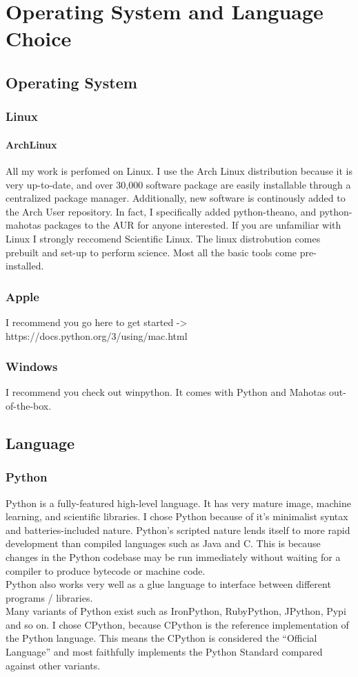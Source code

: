 \chapter{Operating System and Language Choice}

\section{Operating System}
\subsection{Linux}
\subsubsection{ArchLinux}
All my work is perfomed on Linux.  I use the Arch Linux distribution because it is very up-to-date, and over 30,000 software package are easily installable through a centralized package manager.  Additionally, new software is continously added to the Arch User repository.  In fact, I specifically added python-theano, and python-mahotas packages to the AUR for anyone interested.
If you are unfamiliar with Linux I strongly reccomend Scientific Linux.  The linux distrobution comes prebuilt and set-up to perform science.  Most all the basic tools come pre-installed.
\subsection{Apple}
I recommend you go here to get started -> https://docs.python.org/3/using/mac.html
\subsection{Windows}
I recommend you check out winpython.  It comes with Python and Mahotas out-of-the-box.


\section{Language}
\subsection{Python}
Python is a fully-featured high-level language. It has very mature image, machine learning, and scientific libraries.  I chose Python because of it's minimalist syntax and batteries-included nature.  Python's scripted nature lends itself to more rapid development than compiled languages such as Java and C. This is because changes in the Python codebase may be run immediately without waiting for a compiler to produce bytecode or machine code.\\
Python also works very well as a glue language to interface between different programs / libraries.\\
Many variants of Python exist such as IronPython, RubyPython, JPython, Pypi and so on. I chose CPython, because CPython is the reference implementation of the Python language.  This means the CPython is considered the ``Official Language'' and most faithfully implements the Python Standard compared against other variants.
